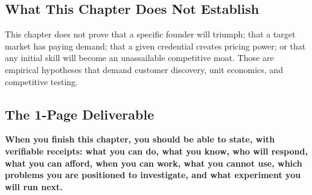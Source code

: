 \subsection{What This Chapter Does Not Establish}

This chapter does not prove that a specific founder will triumph; that a target market has paying demand; that a given credential creates pricing power; or that any initial skill will become an unassailable competitive moat. Those are empirical hypotheses that demand customer discovery, unit economics, and competitive testing.

\subsection{The 1-Page Deliverable}

\textbf{When you finish this chapter, you should be able to state, with verifiable receipts: what you can do, what you know, who will respond, what you can afford, when you can work, what you cannot use, which problems you are positioned to investigate, and what experiment you will run next.}
